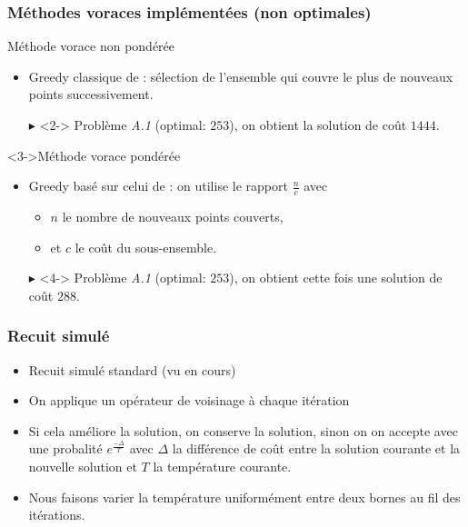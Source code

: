 \documentclass[aspectratio=169,11pt]{beamer}
\begin{document}
	\begin{frame}
		\frametitle{Méthodes voraces implémentées (non optimales)}
		\begin{block}{Méthode vorace non pondérée}
			\begin{itemize}
				\item Greedy classique de \citeauthor{Johnson:1973:AAC:800125.804034}: sélection de l'ensemble qui couvre le plus de nouveaux points successivement.
				\item[\alert{\(\blacktriangleright\)}]<2-> Problème \emph{A.1} (optimal: \(253\)), on obtient la solution de coût \alert{\(1444\)}.
			\end{itemize}
		\end{block}
		\begin{block}<3->{Méthode vorace pondérée}
			\begin{itemize}
				\item Greedy basé sur celui de \citeauthor{Johnson:1973:AAC:800125.804034}: on utilise le rapport \(\frac{n}{c}\) avec
					\begin{itemize}
						\item \(n\) le nombre de nouveaux points couverts,
						\item et \(c\) le coût du sous-ensemble.
					\end{itemize}
				\item[\alert{\(\blacktriangleright\)}]<4-> Problème \emph{A.1} (optimal: \(253\)), on obtient cette fois une solution de coût \alert{\(288\)}.
			\end{itemize}
		\end{block}
	\end{frame}

	\begin{frame}
		\centering
		
	\end{frame}

	\begin{frame}
		\frametitle{Recuit simulé}
		\begin{itemize}
			\item Recuit simulé standard (vu en cours)
			\item On applique un opérateur de voisinage à chaque itération
			\item Si cela améliore la solution, on conserve la solution, sinon on on accepte avec une
				probalité \(e^{\frac{-\Delta}{T}}\) avec \(\Delta\) la différence de coût
				entre la solution courante et la nouvelle solution et \(T\) la température courante.
			\item Nous faisons varier la température uniformément entre deux bornes au fil des itérations.
		\end{itemize}
	\end{frame}
\end{document}
